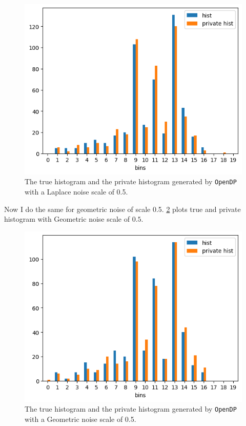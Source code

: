 \documentclass[12pt]{extarticle}
\begin{document}
	 \begin{figure}[h]
	 	\centering
	 	\includegraphics[width=1\textwidth]{im7.png}
	 	\caption{The true histogram and the private histogram generated by \texttt{OpenDP} with a Laplace noise scale of 0.5.}
	 	\label{fig:fig7}
	 \end{figure}
	 Now I do the same for geometric noise of scale 0.5. \ref{fig:fig8} plots true and private histogram with Geometric noise scale of $0.5$.
	 \begin{figure}[h]
	 	\centering
	 	\includegraphics[width=1\textwidth]{im8.png}
	 	\caption{The true histogram and the private histogram generated by \texttt{OpenDP} with a Geometric noise scale of 0.5.}
	 	\label{fig:fig8}
	 \end{figure}
\end{document}
